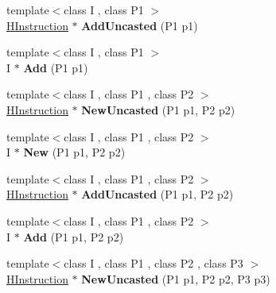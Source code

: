 \begin{DoxyCompactItemize}
\item 
\hypertarget{classv8_1_1internal_1_1_h_graph_builder_a0a8366a2feb984425d6671cb78157e81}{}{\footnotesize template$<$class I , class P1 $>$ }\\\hyperlink{classv8_1_1internal_1_1_h_instruction}{H\+Instruction} $\ast$ {\bfseries Add\+Uncasted} (P1 p1)\label{classv8_1_1internal_1_1_h_graph_builder_a0a8366a2feb984425d6671cb78157e81}

\item 
\hypertarget{classv8_1_1internal_1_1_h_graph_builder_a7d6a298ab96376633d2cd8dd7cc1f618}{}{\footnotesize template$<$class I , class P1 $>$ }\\I $\ast$ {\bfseries Add} (P1 p1)\label{classv8_1_1internal_1_1_h_graph_builder_a7d6a298ab96376633d2cd8dd7cc1f618}

\item 
\hypertarget{classv8_1_1internal_1_1_h_graph_builder_a10cad3de4825148ab4c93b69416e819f}{}{\footnotesize template$<$class I , class P1 , class P2 $>$ }\\\hyperlink{classv8_1_1internal_1_1_h_instruction}{H\+Instruction} $\ast$ {\bfseries New\+Uncasted} (P1 p1, P2 p2)\label{classv8_1_1internal_1_1_h_graph_builder_a10cad3de4825148ab4c93b69416e819f}

\item 
\hypertarget{classv8_1_1internal_1_1_h_graph_builder_aae2acabd10188a0a55dd4840b29f6baf}{}{\footnotesize template$<$class I , class P1 , class P2 $>$ }\\I $\ast$ {\bfseries New} (P1 p1, P2 p2)\label{classv8_1_1internal_1_1_h_graph_builder_aae2acabd10188a0a55dd4840b29f6baf}

\item 
\hypertarget{classv8_1_1internal_1_1_h_graph_builder_a48a8c0ed3a6c2363a1cafba9b4223a37}{}{\footnotesize template$<$class I , class P1 , class P2 $>$ }\\\hyperlink{classv8_1_1internal_1_1_h_instruction}{H\+Instruction} $\ast$ {\bfseries Add\+Uncasted} (P1 p1, P2 p2)\label{classv8_1_1internal_1_1_h_graph_builder_a48a8c0ed3a6c2363a1cafba9b4223a37}

\item 
\hypertarget{classv8_1_1internal_1_1_h_graph_builder_a362f0202012ace8038a9c1cfe239ef12}{}{\footnotesize template$<$class I , class P1 , class P2 $>$ }\\I $\ast$ {\bfseries Add} (P1 p1, P2 p2)\label{classv8_1_1internal_1_1_h_graph_builder_a362f0202012ace8038a9c1cfe239ef12}

\item 
\hypertarget{classv8_1_1internal_1_1_h_graph_builder_a3881f206014cc74df55704065c7b27c1}{}{\footnotesize template$<$class I , class P1 , class P2 , class P3 $>$ }\\\hyperlink{classv8_1_1internal_1_1_h_instruction}{H\+Instruction} $\ast$ {\bfseries New\+Uncasted} (P1 p1, P2 p2, P3 p3)\label{classv8_1_1internal_1_1_h_graph_builder_a3881f206014cc74df55704065c7b27c1}


\end{DoxyCompactItemize}
